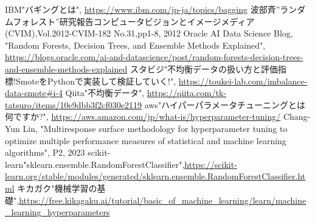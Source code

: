 \documentclass[platex]{suribt}
\begin{document}
\begin{thebibliography}{2}
\bibitem{}
IBM"バギングとは", \url{https://www.ibm.com/jp-ja/topics/bagging}
\bibitem{}
波部斉”ランダムフォレスト”研究報告コンピュータビジョンとイメージメディア(CVIM),Vol.2012-CVIM-182 No.31,pp1-8, 2012
\bibitem{}
Oracle AI Data Science Blog, "Random Forests, Decision Trees, and Ensemble Methods Explained",  \url{https://blogs.oracle.com/ai-and-datascience/post/random-forests-decision-trees-and-ensemble-methods-explained}
\bibitem{}
スタビジ"不均衡データの扱い方と評価指標!SmoteをPythonで実装して検証していく!", \url{https://toukei-lab.com/imbalance-data-smote#i-4}
\bibitem{}
Qiita"不均衡データ", \url{https://qiita.com/tk-tatsuro/items/10e9dbb3f2cf030e2119}
\bibitem{}
aws"ハイパーパラメータチューニングとは何ですか?", \url{https://aws.amazon.com/jp/what-is/hyperparameter-tuning/}
\bibitem{}
Chang-Yun Lin, "Multiresponse surface methodology for hyperparameter tuning to optimize multiple performance measures of statistical and machine learning algorithms", P2, 2023
\bibitem{}
scikit-learn"sklearn.ensemble.RandomForestClassifier",\url{https://scikit-learn.org/stable/modules/generated/sklearn.ensemble.RandomForestClassifier.html}
\bibitem{}
キカガク"機械学習の基礎",\url{https://free.kikagaku.ai/tutorial/basic_of_machine_learning/learn/machine_learning_hyperparameters}


\end{thebibliography}
\appendix%
\chapter{}
\end{document}
